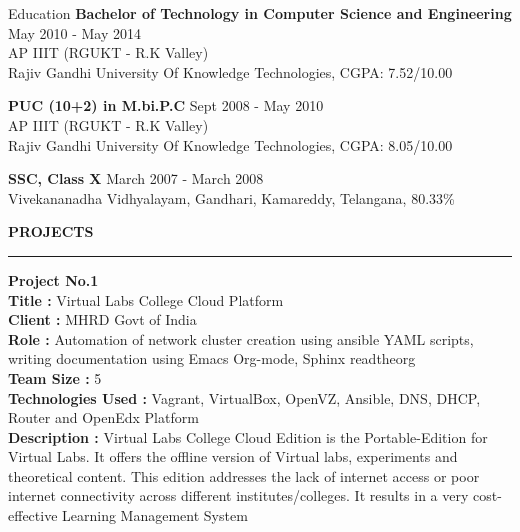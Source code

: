 \documentclass{resume} %
\begin{document}

\begin{rSection}{Education}
  {\bf Bachelor of Technology in Computer Science and Engineering} \hfill {May 2010 - May 2014}
  \\ 
  AP IIIT (RGUKT - R.K Valley)
  \\
  Rajiv Gandhi University Of Knowledge Technologies,  CGPA: 7.52/10.00  
  
  {\bf PUC (10+2) in M.bi.P.C} \hfill {Sept 2008 - May 2010}
  \\
  AP IIIT (RGUKT - R.K Valley)
  \\
  Rajiv Gandhi University Of Knowledge Technologies,  CGPA: 8.05/10.00  
  
  {\textbf{SSC, Class X}}  \hfill March 2007 - March  2008 \\
  Vivekananadha Vidhyalayam, Gandhari, Kamareddy, Telangana, 80.33\% 

\end{rSection}

\break


\textbf{PROJECTS}
\sectionlineskip \\
\hrule
\textbf {Project No.1} \\
\textbf{Title : } Virtual Labs College Cloud Platform \\
\textbf{Client : } MHRD Govt of India \\
\textbf{Role : } Automation of network cluster creation
using ansible YAML scripts, writing documentation
using Emacs Org-mode, Sphinx readtheorg\\
\textbf{Team Size : } 5 \\
\textbf{Technologies Used :} Vagrant, VirtualBox, OpenVZ, Ansible, DNS, DHCP, Router and
OpenEdx Platform \\
\textbf{Description :} Virtual Labs
College Cloud Edition is the Portable-Edition for Virtual
Labs. It offers the offline version of Virtual labs,
experiments and theoretical content. This edition addresses
the lack of internet access or poor internet connectivity
across different institutes/colleges. It results in a very
cost-effective Learning Management System
\end{document}
